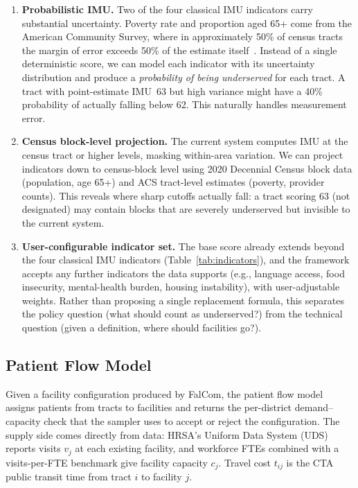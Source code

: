 \documentclass[11pt]{article}
\begin{document}
\begin{enumerate}[nosep]
    \item \textbf{Probabilistic IMU.} Two of the four classical IMU indicators carry substantial uncertainty. Poverty rate and proportion aged 65+ come from the American Community Survey, where in approximately 50\% of census tracts the margin of error exceeds 50\% of the estimate itself~\cite{spielman2014patterns}. Instead of a single deterministic score, we can model each indicator with its uncertainty distribution and produce a \emph{probability of being underserved} for each tract. A tract with point-estimate IMU~63 but high variance might have a 40\% probability of actually falling below 62. This naturally handles measurement error.

    \item \textbf{Census block-level projection.} The current system computes IMU at the census tract or higher levels, masking within-area variation. We can project indicators down to census-block level using 2020 Decennial Census block data (population, age 65+) and ACS tract-level estimates (poverty, provider counts). This reveals where sharp cutoffs actually fall: a tract scoring 63 (not designated) may contain blocks that are severely underserved but invisible to the current system.

    \item \textbf{User-configurable indicator set.} The base score already extends beyond the four classical IMU indicators (Table~\ref{tab:indicators}), and the framework accepts any further indicators the data supports (e.g., language access, food insecurity, mental-health burden, housing instability), with user-adjustable weights. Rather than proposing a single replacement formula, this separates the policy question (what should count as underserved?) from the technical question (given a definition, where should facilities go?).
\end{enumerate}


\subsection{Patient Flow Model}\label{sec:flow}

Given a facility configuration produced by FalCom, the patient flow model assigns patients from tracts to facilities and returns the per-district demand--capacity check that the sampler uses to accept or reject the configuration. The supply side comes directly from data: HRSA's Uniform Data System (UDS) reports visits $v_j$ at each existing facility, and workforce FTEs combined with a visits-per-FTE benchmark give facility capacity $c_j$. Travel cost $t_{ij}$ is the CTA public transit time from tract $i$ to facility $j$.
\end{document}
